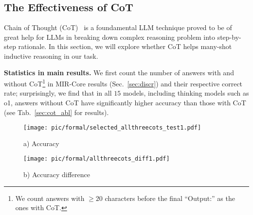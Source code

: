 \subsection{The Effectiveness of CoT}
\label{sec:cot}

Chain of Thought (CoT)~\citep{wei2022chain} is a foundamental LLM technique proved to be of great help for LLMs in breaking down complex reasoning problem into step-by-step rationale. In this section, we will explore whether CoT helps many-shot inductive reasoning in our task.


\textbf{Statistics in main results.} We first count the number of answers with and without CoT\footnote{We count answers with $\geq 20$ characters before the final ``Output:'' as the ones with CoT.} in MIR-Core results (Sec.~\ref{sec:discr}) and their respective correct rate; surprisingly, we find that in all $15$ models, including thinking models such as o1, answers without CoT have significantly higher accuracy than those with CoT (see Tab.~\ref{sec:cot_abl} for results).

\begin{figure}[ht]
        \centering
        \begin{minipage}{0.48\linewidth}
        \centering
        \texttt{[image: pic/formal/selected\_allthreecots\_test1.pdf]}
        \caption*{a) Accuracy}
        \end{minipage}
        \begin{minipage}{0.48\linewidth}
        \centering
        \texttt{[image: pic/formal/allthreecots\_diff1.pdf]}
        \caption*{b) Accuracy difference}
        \end{minipage}
        \label{fig:main_cot}
\end{figure}


